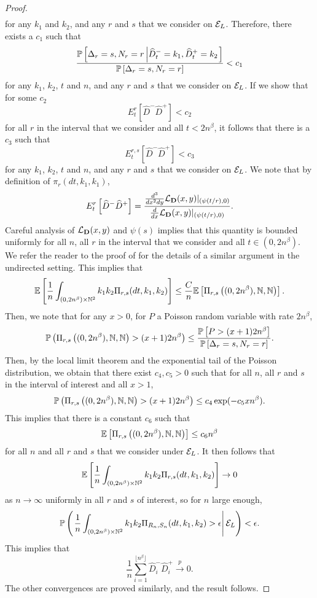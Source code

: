 \begin{proof}
\begin{align*}
\end{align*} for any $k_1$ and $k_2$, and any $r$ and $s$ that we consider on $\cE_L$. Therefore, there exists a $c_1$ such that
$$\frac{\P\left[ \Delta_r=s, N_r=r \left| \widehat{D}^-_t=k_1,\widehat{D}^+_t=k_2\right.\right]}{\P\left[ \Delta_r=s, N_r=r\right]}<c_1$$
for any $k_1$, $k_2$, $t$ and $n$, and any $r$ and $s$ that we consider on $\cE_L$. If we show that for some $c_2$ $${E}^r_t\left[\widehat{D}^-\widehat{D}^+\right]<c_2$$ for all $r$ in the interval that we consider and all $t<2n^\beta$, it follows that there is a $c_3$ such that
$${E}^{r,s}_t\left[\widehat{D}^-\widehat{D}^+\right]<c_3$$ 
for any $k_1$, $k_2$, $t$ and $n$, and any $r$ and $s$ that we consider on $\cE_L$.
We note that by definition of $\pi_r(dt,k_1,k_1)$, 
$${E}^r_t\left[\widehat{D}^-\widehat{D}^+\right]=\frac{\frac{d^3}{dx^2 dy}\cL_{\mathbf{D}}(x,y)|_{(\psi(t/r),0)}}{\frac{d}{dx}\cL_{\mathbf{D}}(x,y)|_{(\psi(t/r),0)}}.$$
Careful analysis of $\cL_{\mathbf{D}}(x,y)$ and $\psi(s)$ implies that this quantity is bounded uniformly for all $n$, all $r$ in the interval that we consider and all $t\in(0,2n^\beta)$. We refer the reader to the proof of   \cite[Lemma A.1]{josephComponentSizesCritical2014} for the details of a similar argument in the undirected setting.
This implies that 
$$\E\left[\frac{1}{n}\int_{(0,2n^\beta)\times \N^2}k_1k_2 \Pi_{r,s}(dt,k_1,k_2) \right]\leq \frac{C}{n}\E\left[\Pi_{r,s}\left((0,2n^\beta),\N,\N\right)\right].$$
Then, we note that for any $x>0$, for $P$ a Poisson random variable with rate $2n^\beta$,
$$\P\left(\Pi_{r,s}\left((0,2n^\beta),\N,\N\right)>(x+1)2n^\beta\right)\leq \frac{\P\left[P>(x+1)2n^\beta \right]}{\P\left[ \Delta_r=s, N_r=r\right]}.$$
Then, by the local limit theorem and the exponential tail of the Poisson distribution, we obtain that there exist $c_4,c_5>0$ such that for all $n$, all $r$ and $s$ in the interval of interest and all $x>1$,
$$\P\left(\Pi_{r,s}\left((0,2n^\beta),\N,\N\right)>(x+1)2n^\beta\right)\leq c_4\exp(-c_5xn^\beta).$$
This implies that there is a constant $c_6$ such that 
$$\E\left[\Pi_{r,s}\left((0,2n^\beta),\N,\N\right)\right]\leq c_6 n^\beta$$
for all $n$ and all $r$ and $s$ that we consider under $\cE_L$. 
It then follows that 
$$\E\left[\frac{1}{n}\int_{(0,2n^\beta)\times \N^2}k_1k_2 \Pi_{r,s}(dt,k_1,k_2) \right]\to 0$$
as $n\to \infty$ uniformly in all $r$ and $s$ of interest, so for $n$ large enough,
$$\P\left(\left.\frac{1}{n}\int_{(0,2n^\beta)\times \N^2}k_1k_2 \Pi_{R_n,S_n}(dt,k_1,k_2)>\epsilon  \right|\cE_L \right)<\epsilon.$$
This implies that
$$\frac{1}{n}\sum_{i=1}^{\lfloor n^\beta \rfloor}\widehat{D}_i^- \widehat{D}_i^+\overset{p}{\to}0.$$
The other convergences are proved similarly, and the result follows. 
\end{proof}